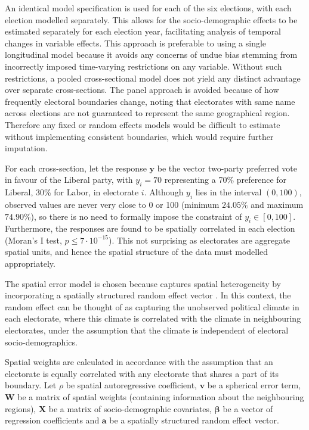 \documentclass[11pt,a4paper,]{article}
\begin{document}
An identical model specification is used for each of the six elections, with each election modelled separately. This allows for the socio-demographic effects to be estimated separately for each election year, facilitating analysis of temporal changes in variable effects. This approach is preferable to using a single longitudinal model because it avoids any concerns of undue bias stemming from incorrectly imposed time-varying restrictions on any variable. Without such restrictions, a pooled cross-sectional model does not yield any distinct advantage over separate cross-sections. The panel approach is avoided because of how frequently electoral boundaries change, noting that electorates with same name across elections are not guaranteed to represent the same geographical region. Therefore any fixed or random effects models would be difficult to estimate without implementing consistent boundaries, which would require further imputation.

For each cross-section, let the response \(\boldsymbol y\) be the vector two-party preferred vote in favour of the Liberal party, with \(y_i = 70\) representing a 70\% preference for Liberal, 30\% for Labor, in electorate \(i\). Although \(y_i\) lies in the interval \((0,100)\), observed values are never very close to 0 or 100 (minimum \(24.05 \%\) and maximum \(74.90 \%\)), so there is no need to formally impose the constraint of \(y_i \in [0,100]\). Furthermore, the responses are found to be spatially correlated in each election (Moran's I test, \(p \le 7\cdot10^{-15}\)). This not surprising as electorates are aggregate spatial units, and hence the spatial structure of the data must modelled appropriately.

The spatial error model \autocite{Anselin88} is chosen because captures spatial heterogeneity by incorporating a spatially structured random effect vector \autocite{LeSage2009}. In this context, the random effect can be thought of as capturing the unobserved political climate in each electorate, where this climate is correlated with the climate in neighbouring electorates, under the assumption that the climate is independent of electoral socio-demographics.

Spatial weights are calculated in accordance with the assumption that an electorate is equally correlated with any electorate that shares a part of its boundary. Let \(\rho\) be spatial autoregressive coefficient, \(\boldsymbol v\) be a spherical error term, \({\boldsymbol W}\) be a matrix of spatial weights (containing information about the neighbouring regions), \(\boldsymbol X\) be a matrix of socio-demographic covariates, \(\boldsymbol \beta\) be a vector of regression coefficients and \(\boldsymbol a\) be a spatially structured random effect vector.
\end{document}
